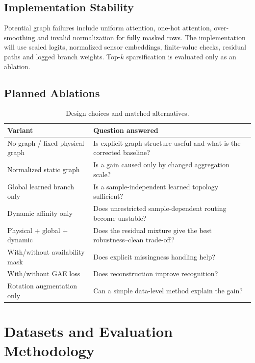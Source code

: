 \documentclass[12pt,a4paper,twoside,openright]{report}
\begin{document}
\section{Implementation Stability}
Potential graph failures include uniform attention, one-hot attention, over-smoothing and invalid normalization for fully masked rows. The implementation will use scaled logits, normalized sensor embeddings, finite-value checks, residual paths and logged branch weights. Top-$k$ sparsification is evaluated only as an ablation.

\section{Planned Ablations}
\begin{table}[hbt!]
\centering
\small
\renewcommand{\arraystretch}{1.3}
\caption{Design choices and matched alternatives.}
\label{tab:design-ablation}
\begin{tabularx}{\textwidth}{@{}P{0.29\textwidth}Y@{}}
\toprule
\textbf{Variant} & \textbf{Question answered} \\
\midrule
No graph / fixed physical graph & Is explicit graph structure useful and what is the corrected baseline? \\
Normalized static graph & Is a gain caused only by changed aggregation scale? \\
Global learned branch only & Is a sample-independent learned topology sufficient? \\
Dynamic affinity only & Does unrestricted sample-dependent routing become unstable? \\
Physical + global + dynamic & Does the residual mixture give the best robustness--clean trade-off? \\
With/without availability mask & Does explicit missingness handling help? \\
With/without GAE loss & Does reconstruction improve recognition? \\
Rotation augmentation only & Can a simple data-level method explain the gain? \\
\bottomrule
\end{tabularx}
\end{table}

\cleardoublepage
\chapter[Datasets and Evaluation Methodology]{Datasets and Evaluation\\Methodology}
\end{document}

